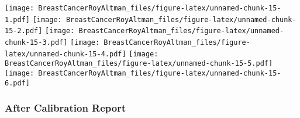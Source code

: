 \documentclass[
]{article}
\newenvironment{Shaded}{\begin{snugshade}}{\end{snugshade}}
\newcommand{\AttributeTok}[1]{\textcolor[rgb]{0.77,0.63,0.00}{#1}}
\newcommand{\FloatTok}[1]{\textcolor[rgb]{0.00,0.00,0.81}{#1}}
\newcommand{\FunctionTok}[1]{\textcolor[rgb]{0.00,0.00,0.00}{#1}}
\newcommand{\NormalTok}[1]{#1}
\newcommand{\OtherTok}[1]{\textcolor[rgb]{0.56,0.35,0.01}{#1}}
\newcommand{\SpecialCharTok}[1]{\textcolor[rgb]{0.00,0.00,0.00}{#1}}
\newcommand{\StringTok}[1]{\textcolor[rgb]{0.31,0.60,0.02}{#1}}
\begin{document}
\begin{Shaded}
\end{Shaded}

\texttt{[image: BreastCancerRoyAltman\_files/figure-latex/unnamed-chunk-15-1.pdf]}
\texttt{[image: BreastCancerRoyAltman\_files/figure-latex/unnamed-chunk-15-2.pdf]}
\texttt{[image: BreastCancerRoyAltman\_files/figure-latex/unnamed-chunk-15-3.pdf]}
\texttt{[image: BreastCancerRoyAltman\_files/figure-latex/unnamed-chunk-15-4.pdf]}
\texttt{[image: BreastCancerRoyAltman\_files/figure-latex/unnamed-chunk-15-5.pdf]}
\texttt{[image: BreastCancerRoyAltman\_files/figure-latex/unnamed-chunk-15-6.pdf]}

\hypertarget{after-calibration-report}{%
\subsubsection{After Calibration
Report}\label{after-calibration-report}}

\begin{Shaded}
\end{Shaded}
\end{document}
